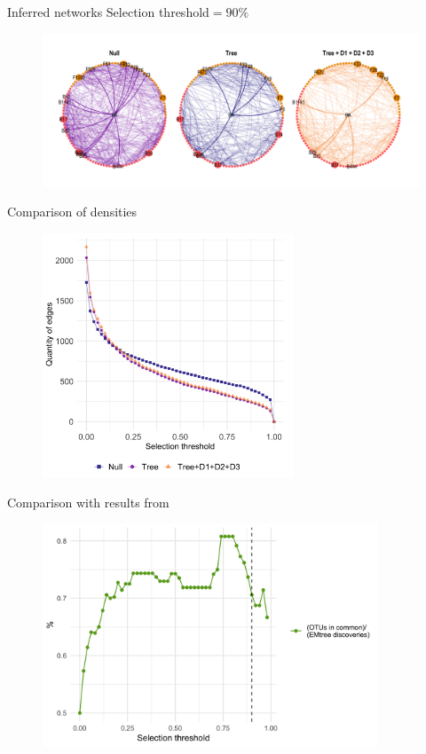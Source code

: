 \documentclass[11pt]{beamer}
\begin{document}
\begin{frame}{Inferred networks}
Selection threshold$=90\%$

    \begin{figure}[htp]
\hspace*{-0.7cm}%
\includegraphics[width=13.5cm]{Oaknet_90_btw.png}
\end{figure}
\end{frame}

\begin{frame}{Comparison of densities}
    \begin{figure}[htp]
\centering
\includegraphics[width=7.5cm]{qetOak.png}
\end{figure}
\end{frame}

\begin{frame}{Comparison with results from \cite{jakuch}}
    \begin{figure}[htp]
\centering
\includegraphics[width=10cm]{propOTUS.png}
\end{figure}
\end{frame}
\end{document}
